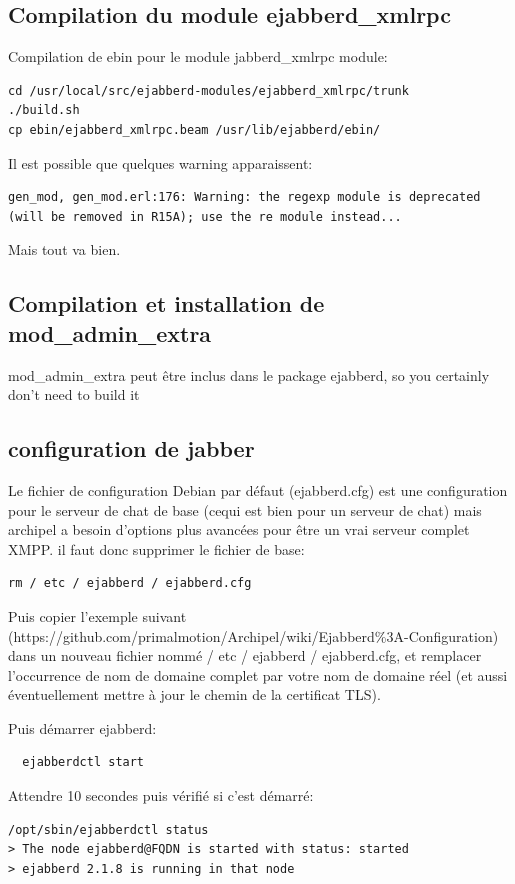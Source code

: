 \subsection{Compilation du module ejabberd\_xmlrpc}
Compilation de ebin pour le module jabberd\_xmlrpc module:
\begin{lstlisting}
cd /usr/local/src/ejabberd-modules/ejabberd_xmlrpc/trunk
./build.sh
cp ebin/ejabberd_xmlrpc.beam /usr/lib/ejabberd/ebin/
\end{lstlisting}
Il est possible que quelques warning apparaissent: 
\begin{lstlisting}
gen_mod, gen_mod.erl:176: Warning: the regexp module is deprecated (will be removed in R15A); use the re module instead...
\end{lstlisting}
Mais tout va bien.

\subsection{Compilation et installation de mod\_admin\_extra}
mod\_admin\_extra peut être inclus dans le package ejabberd, so you certainly don't need to build it

\subsection{configuration de jabber}
Le fichier de configuration Debian par défaut (ejabberd.cfg)  est une configuration pour le serveur de chat de base 
(cequi est bien pour un serveur de chat) mais archipel a besoin d'options plus avancées pour être un vrai serveur 
complet XMPP. il faut donc supprimer le fichier de base:
\begin{lstlisting}
rm / etc / ejabberd / ejabberd.cfg
\end{lstlisting}
Puis copier l'exemple suivant\newline 
(https://github.com/primalmotion/Archipel/wiki/Ejabberd\%3A-Configuration) 
dans un nouveau fichier nommé / etc / ejabberd / ejabberd.cfg, 
et remplacer l'occurrence de nom de domaine complet par votre nom de domaine 
réel (et aussi éventuellement mettre à jour le chemin de la certificat TLS).\newline

Puis démarrer ejabberd:
\begin{lstlisting}
  ejabberdctl start
\end{lstlisting}

Attendre 10 secondes puis vérifié si c'est démarré:
\begin{lstlisting}
/opt/sbin/ejabberdctl status
> The node ejabberd@FQDN is started with status: started
> ejabberd 2.1.8 is running in that node
\end{lstlisting}

